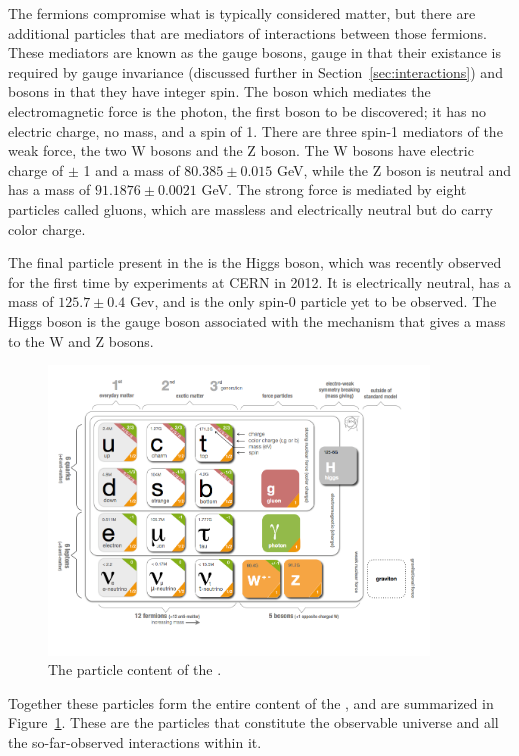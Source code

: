 The fermions compromise what is typically considered matter, but there are additional particles that are mediators of interactions between those fermions.
These mediators are known as the gauge bosons, gauge in that their existance is required by gauge invariance (discussed further in Section~\ref{sec:interactions}) and bosons in that they have integer spin.
The boson which mediates the electromagnetic force is the photon, the first boson to be discovered; it has no electric charge, no mass, and a spin of 1.
There are three spin-1 mediators of the weak force, the two W bosons and the Z boson. 
The W bosons have electric charge of $\pm$ 1 and a mass of $80.385 \pm 0.015$ GeV, while the Z boson is neutral and has a mass of $91.1876 \pm 0.0021$ GeV. 
The strong force is mediated by eight particles called gluons, which are massless and electrically neutral but do carry color charge. 

The final particle present in the \SM is the Higgs boson, which was recently observed for the first time by experiments at CERN in 2012. 
It is electrically neutral, has a mass of $125.7 \pm 0.4$ Gev, and is the only spin-0 particle yet to be observed. 
The Higgs boson is the gauge boson associated with the mechanism that gives a mass to the W and Z bosons.

\begin{figure}[h]
  \centering
  \includegraphics[width=0.9\textwidth]{figures/particle_content.png}
  \caption{The particle content of the \SM.}
  \label{fig:particle_content}
\end{figure}

Together these particles form the entire content of the \SM, and are summarized in Figure~\ref{fig:particle_content}. These are the particles that constitute the observable universe and all the so-far-observed interactions within it.


